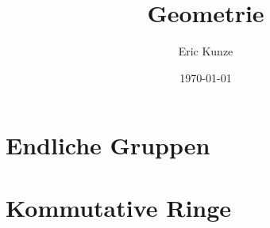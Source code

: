 \documentclass[a4paper, 11pt, chapterprefix, ngerman]{scrreprt}
\begin{document}
\setlength\abovedisplayshortskip{3pt}
\setlength\belowdisplayshortskip{3pt}
\setlength\abovedisplayskip{3pt}
\setlength\belowdisplayskip{3pt}

\title{Geometrie}
\author{Eric Kunze}
\date{\today}
\maketitle[0]

\chapter{Endliche Gruppen}







\chapter{Kommutative Ringe}

\end{document}
